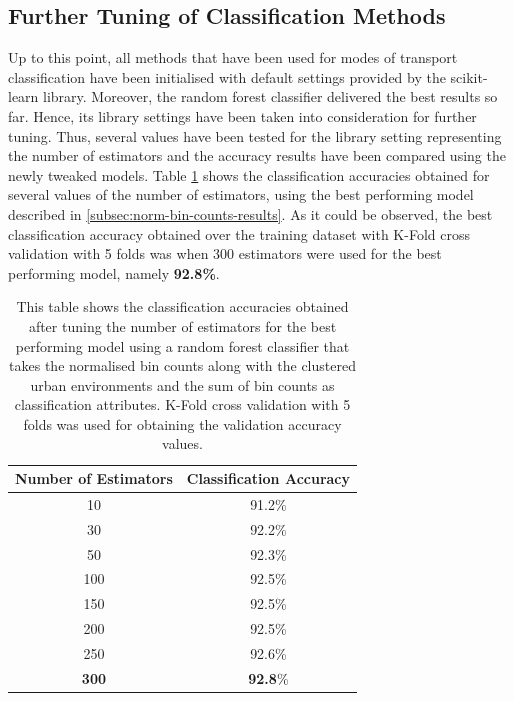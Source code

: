 \documentclass[bsc,frontabs,twoside,singlespacing, parskip,deptreport]{infthesis}     %
\begin{document}
\subsection{Further Tuning of Classification Methods}
\label{subsec:classifier-tweaking}

Up to this point, all methods that have been used for modes of transport classification have been initialised with default settings provided by the scikit-learn library. Moreover, the random forest classifier delivered the best results so far. Hence, its library settings have been taken into consideration for further tuning. Thus, several values have been tested for the library setting representing the number of estimators and the accuracy results have been compared using the newly tweaked models. Table \ref{table:n-estimators} shows the classification accuracies obtained for several values of the number of estimators, using the best performing model described in \ref{subsec:norm-bin-counts-results}. As it could be observed, the best classification accuracy obtained over the training dataset with K-Fold cross validation with 5 folds was when 300 estimators were used for the best performing model, namely \textbf{92.8\%}.

\begin{table}[h!]
\centering
 \begin{tabular}{|| c | c ||} 
 \hline
 Number of Estimators & Classification Accuracy \\ [0.5ex] 
 \hline\hline
 10 & 91.2\% \\ 
 \hline
 30 & 92.2\% \\ 
 \hline
 50 & 92.3\% \\ 
 \hline
 100 & 92.5\% \\ 
 \hline
 150 & 92.5\% \\
 \hline
  200 & 92.5\% \\ 
 \hline
   250 & 92.6\% \\ 
 \hline
 \textbf{300} & \textbf{92.8}\% \\ 
 \hline
\end{tabular}
\caption{This table shows the classification accuracies obtained after tuning the number of estimators for the best performing model using a random forest classifier that takes the normalised bin counts along with the clustered urban environments and the sum of bin counts as classification attributes. K-Fold cross validation with 5 folds was used for obtaining the validation accuracy values.}
\label{table:n-estimators}
\end{table}
\end{document}
